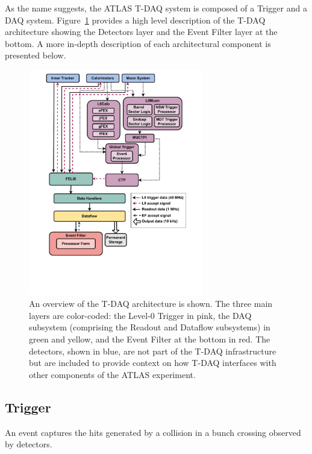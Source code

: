 As the name suggests, the \acs{ATLAS} \acf{T-DAQ} system is composed of a Trigger and a \acf{DAQ} system. Figure~\ref{fig:tdaq} provides a high level description of the \acs{T-DAQ} architecture showing the Detectors layer and the Event Filter layer at the bottom. A more in-depth description of each architectural component is presented below.

\begin{figure}[htbp]
\centering
\includegraphics[width=0.68\textwidth]{images/introduction/Baseline_TDAQ_Phase-II_Architecture.pdf}
\caption[Overview of the T-DAQ architecture]{An overview of the \acs{T-DAQ} architecture is shown. The three main layers are color-coded: the Level-0 Trigger in pink, the DAQ subsystem (comprising the Readout and Dataflow subsystems) in green and yellow, and the Event Filter at the bottom in red. The detectors, shown in blue, are not part of the T-DAQ infrastructure but are included to provide context on how T-DAQ interfaces with other components of the \acs{ATLAS} experiment.}
\label{fig:tdaq}
\end{figure}

\subsection{Trigger}

\begin{definition}
\label{def:event}
An event captures the hits generated by a collision in a bunch crossing observed by detectors.
\end{definition}


